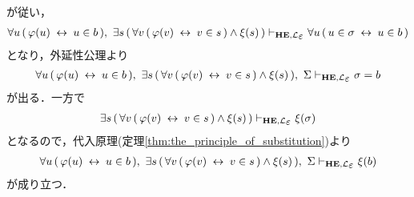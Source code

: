 \begin{metaprf}
\begin{description}
\begin{description}
						が従い，
						\begin{align}
							\forall u\, (\, \varphi(u) \lrarrow u \in b\, ),\ 
							\exists s\, (\, \forall v\, (\, \varphi(v) \lrarrow v \in s\, ) \wedge \xi(s)\, )
							\provable{\mbox{{\bf HE}},\lang{\varepsilon}} \forall u\, (\, u \in \sigma \lrarrow u \in b\, )
						\end{align}
						となり，外延性公理より
						\begin{align}
							\forall u\, (\, \varphi(u) \lrarrow u \in b\, ),\ 
							\exists s\, (\, \forall v\, (\, \varphi(v) \lrarrow v \in s\, ) \wedge \xi(s)\, ),\ 
							\Sigma
							\provable{\mbox{{\bf HE}},\lang{\varepsilon}} \sigma = b
						\end{align}
						が出る．一方で
						\begin{align}
							\exists s\, (\, \forall v\, (\, \varphi(v) \lrarrow v \in s\, ) \wedge \xi(s)\, )
							\provable{\mbox{{\bf HE}},\lang{\varepsilon}} \xi(\sigma)
						\end{align}
						となるので，代入原理(定理\ref{thm:the_principle_of_substitution})より
						\begin{align}
							\forall u\, (\, \varphi(u) \lrarrow u \in b\, ),\ 
							\exists s\, (\, \forall v\, (\, \varphi(v) \lrarrow v \in s\, ) \wedge \xi(s)\, ),\ 
							\Sigma
							\provable{\mbox{{\bf HE}},\lang{\varepsilon}} \xi(b)
						\end{align}
						が成り立つ．
						

\end{description}
\end{description}
\end{metaprf}
